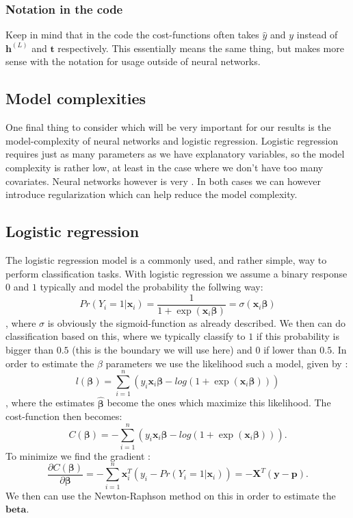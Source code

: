 \documentclass{article}
\begin{document}
\subsubsection{Notation in the code}
Keep in mind that in the code the cost-functions often takes $\hat{y}$ and $y$
instead of $\bm{h}^{(L)}$ and $\bm{t}$ respectively. This essentially means the
same thing, but makes more sense with the notation for usage outside of neural
networks.

\subsection{Model complexities}
One final thing to consider which will be very important for our results is the
model-complexity of neural networks and logistic regression. Logistic regression
requires just as many parameters as we have explanatory variables, so the model
complexity is rather low, at least in the case where we don't have too many
covariates. Neural networks however is very . In both cases we can however introduce regularization which can help
reduce the model complexity.

\subsection{Logistic regression}
The logistic regression model is a commonly used, and rather simple, way to
perform classification tasks. With logistic regression we assume a binary
response $0$ and $1$ typically and model the probability the follwing way:
$$Pr(Y_i = 1 | \bm{x}_i) = \frac{1}{1 + \exp(\bm{x}_i \bm{\beta})} = \sigma(\bm{x}_i \bm{\beta})$$
, where $\sigma$ is obviously the sigmoid-function as already described. We then
can do classification based on this, where we typically classify to $1$ if this
probability is bigger than $0.5$ (this is the boundary we will use here) and $0$
if lower than $0.5$. In order to estimate the $\beta$ parameters we use the
likelihood such a model, given by \cite[s.~4.4]{hastie2009elements}:
$$l(\bm{\beta}) = \sum_{i=1}^{n} (y_i \bm{x}_i \bm{\beta} - log(1 + \exp(\bm{x}_i \bm{\beta})))$$
, where the estimates $\hat{\bm{\beta}}$ become the ones which maximize this
likelihood. The cost-function then becomes:
$$C(\bm{\beta}) = -\sum_{i=1}^{n} (y_i \bm{x}_i \bm{\beta} - log(1 + \exp(\bm{x}_i \bm{\beta}))).$$
To minimize we find the gradient \cite[s.~4.4]{hastie2009elements}:
$$\frac{\partial C(\bm{\beta})}{\partial \bm{\beta}} = -\sum_{i=1}^{n}\bm{x}_i^T(y_i - Pr(Y_i = 1 | \bm{x}_i)) = -\bm{X}^T(\bm{y} - \bm{p}).$$
We then can use the Newton-Raphson method on this in order to estimate the $\bm{beta}$.
\end{document}
